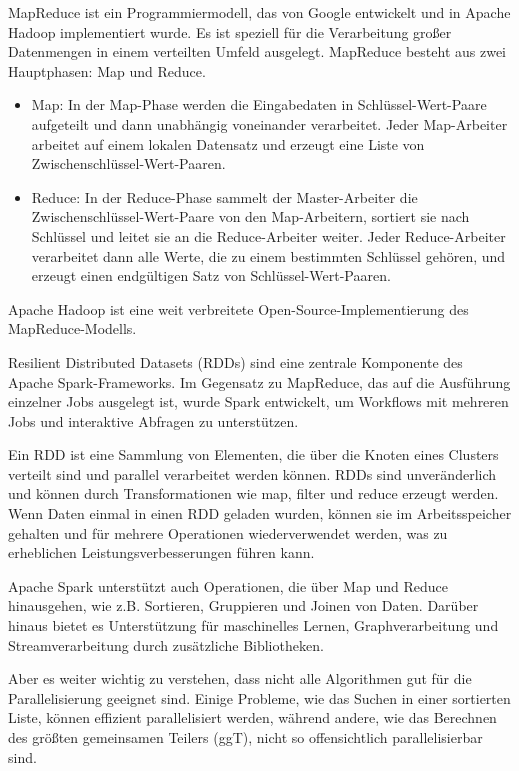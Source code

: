 MapReduce ist ein Programmiermodell, das von Google entwickelt und in Apache Hadoop implementiert wurde. Es ist speziell für die Verarbeitung großer Datenmengen in einem verteilten Umfeld ausgelegt. MapReduce besteht aus zwei Hauptphasen: Map und Reduce.
\begin{itemize}
\item Map: In der Map-Phase werden die Eingabedaten in Schlüssel-Wert-Paare aufgeteilt und dann unabhängig voneinander verarbeitet. Jeder Map-Arbeiter arbeitet auf einem lokalen Datensatz und erzeugt eine Liste von Zwischenschlüssel-Wert-Paaren.
\item Reduce: In der Reduce-Phase sammelt der Master-Arbeiter die Zwischenschlüssel-Wert-Paare von den Map-Arbeitern, sortiert sie nach Schlüssel und leitet sie an die Reduce-Arbeiter weiter. Jeder Reduce-Arbeiter verarbeitet dann alle Werte, die zu einem bestimmten Schlüssel gehören, und erzeugt einen endgültigen Satz von Schlüssel-Wert-Paaren. 
\end{itemize}
Apache Hadoop ist eine weit verbreitete Open-Source-Implementierung des MapReduce-Modells. 

Resilient Distributed Datasets (RDDs) sind eine zentrale Komponente des Apache Spark-Frameworks. Im Gegensatz zu MapReduce, das auf die Ausführung einzelner Jobs ausgelegt ist, wurde Spark entwickelt, um Workflows mit mehreren Jobs und interaktive Abfragen zu unterstützen.

Ein RDD ist eine Sammlung von Elementen, die über die Knoten eines Clusters verteilt sind und parallel verarbeitet werden können. RDDs sind unveränderlich und können durch Transformationen wie map, filter und reduce erzeugt werden. Wenn Daten einmal in einen RDD geladen wurden, können sie im Arbeitsspeicher gehalten und für mehrere Operationen wiederverwendet werden, was zu erheblichen Leistungsverbesserungen führen kann.

Apache Spark unterstützt auch Operationen, die über Map und Reduce hinausgehen, wie z.B. Sortieren, Gruppieren und Joinen von Daten. Darüber hinaus bietet es Unterstützung für maschinelles Lernen, Graphverarbeitung und Streamverarbeitung durch zusätzliche Bibliotheken.


Aber es weiter wichtig zu verstehen, dass nicht alle Algorithmen gut für die Parallelisierung geeignet sind. Einige Probleme, wie das Suchen in einer sortierten Liste, können effizient parallelisiert werden, während andere, wie das Berechnen des größten gemeinsamen Teilers (ggT), nicht so offensichtlich parallelisierbar sind.

